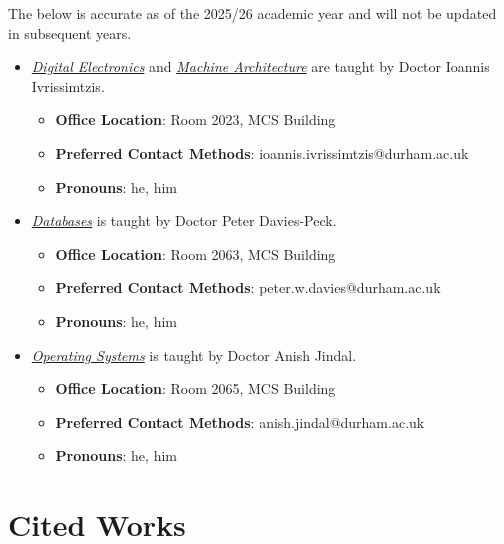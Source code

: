 \documentclass{article}
\begin{document}
The below is accurate as of the 2025/26 academic year and will not be updated in subsequent years.
\begin{itemize}
    \item \hyperref[part:1.de]{\textit{Digital Electronics}} and \hyperref[part:2.ma]{\textit{Machine Architecture}} are taught by Doctor Ioannis Ivrissimtzis.
    \begin{itemize}
        \item \textbf{Office Location}: Room 2023, MCS Building
        \item \textbf{Preferred Contact Methods}: ioannis.ivrissimtzis@durham.ac.uk
        \item \textbf{Pronouns}: he, him
    \end{itemize}
    
    \item \hyperref[part:3.db]{\textit{Databases}} is taught by Doctor Peter Davies-Peck.
    \begin{itemize}
        \item \textbf{Office Location}: Room 2063, MCS Building
        \item \textbf{Preferred Contact Methods}: peter.w.davies@durham.ac.uk
        \item \textbf{Pronouns}: he, him
    \end{itemize}
    
    \item \hyperref[part:4.os]{\textit{Operating Systems}} is taught by Doctor Anish Jindal.
    \begin{itemize}
        \item \textbf{Office Location}: Room 2065, MCS Building
        \item \textbf{Preferred Contact Methods}: anish.jindal@durham.ac.uk
        \item \textbf{Pronouns}: he, him
    \end{itemize}
\end{itemize}

\section{Cited Works}
\end{document}
